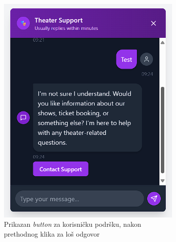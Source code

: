 \begin{itemize}
\begin{figure}[H]
    \centering
    \begin{subfigure}[b]{0.45\textwidth}
        \centering
        \includegraphics[width=\linewidth]{Slike/FZ6/chatsupportbutton.png}
        \caption{Prikazan \textit{button} za korisničku podršku, nakon prethodnog klika za loš odgovor}
        \label{fig:chatsupportbutton}
    \end{subfigure}
    \hfill
    \begin{subfigure}[b]{0.45\textwidth}
        \centering

\end{subfigure}
\end{figure}
\end{itemize}
